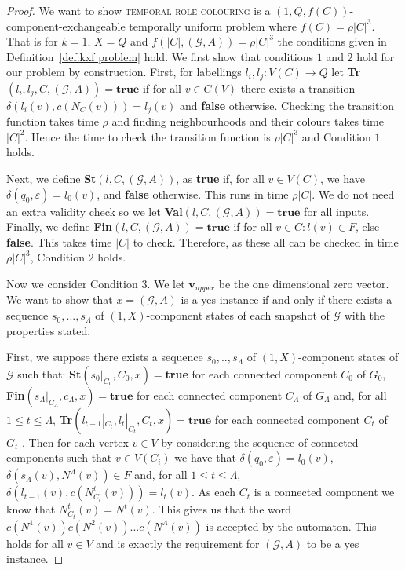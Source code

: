 \documentclass[runningheads]{llncs}
\begin{document}
\begin{proof}
We want to show \textsc{temporal role colouring} is a $(1,Q,f(C))$-component-exchangeable temporally uniform problem where $f(C)=\rho|C|^3$. That is for $k=1$, $X=Q$ and $f(|C|,(\mathcal{G},A))=\rho|C|^3$ the conditions given in Definition~\ref{def:kxf problem} hold.
We first show that conditions $1$ and $2$ hold for our problem by construction.
First, for labellings $l_i,l_j: V(C) \rightarrow Q$ let \textbf{Tr}$(l_i,l_j,C,(\mathcal{G},A))=\textbf{true}$ if for all $v \in C(V)$ there exists a transition $\delta(l_i(v),c(N_C(v)))=l_j(v)$ and \textbf{false} otherwise. Checking the transition function takes time $\rho$ and finding neighbourhoods and their colours takes time $|C|^2$. Hence the time to check the transition function is $\rho|C|^3$ and Condition $1$ holds.

Next, we define \textbf{St}$(l, C,(\mathcal{G},A))$, as \textbf{true} if, for all $v \in V(C)$, we have $\delta(q_0,\varepsilon)=l_0(v)$, and \textbf{false} otherwise. This runs in time $\rho|C|$. We do not need an extra validity check so we let \textbf{Val}$(l,C,(\mathcal{G},A)) =\textbf{true}$ for all inputs. Finally, we define \textbf{Fin}$(l,C,(\mathcal{G},A))=\textbf{true}$ if for all $v\in C: l(v)\in F$, else \textbf{false}. This takes time $|C|$ to check. Therefore, as these all can be checked in time $\rho|C|^3$, Condition $2$ holds. 

Now we consider Condition $3$. We let $\textbf{v}_{upper}$ be the one dimensional zero vector. We want to show that $x=(\mathcal{G},A)$ is a yes instance if and only if there exists a sequence $s_0,...,s_\Lambda$ of $(1,X)$-component states of each snapshot of $\mathcal{G}$ with the properties stated.

First, we suppose there exists a sequence $s_0,..,s_\Lambda$ of $(1,X)$-component states of $\mathcal{G}$ such that:
\textbf{St}$(s_0|_{C_0},C_0,x)=$\textbf{true} for each connected component $C_0$ of $G_0$, \textbf{Fin}$(s_\Lambda|_{C_\Lambda},c_\Lambda,x)=\textbf{true}$ for each connected component $C_\Lambda$ of $G_\Lambda$ and, for all $1\leq t \leq \Lambda$, \textbf{Tr}$(l_{t-1}|_{C_t},l_t|_{C_t},C_t,x) = \textbf{true}$ for each connected component $C_t$ of $G_t$ .
Then for each vertex $v \in V$ by considering the sequence of connected components such that $v \in V(C_i)$ we have that $\delta(q_0,\varepsilon)=l_0(v)$, $\delta(s_\Lambda(v),N^\Lambda(v))\in F$ and, for all $1\leq t \leq \Lambda$, $\delta(l_{t-1}(v),c(N^t_{C_t}(v)))=l_t(v)$.
As each $C_t$ is a connected component we know that $N^t_{C_t}(v)=N^t(v)$. This gives us that the word  $c(N^1(v))c(N^2(v))...c(N^\Lambda(v))$ is accepted by the automaton. This holds for all $v \in V$ and is exactly the requirement for $(\mathcal{G},A)$ to be a yes instance.




\end{proof}
\end{document}
